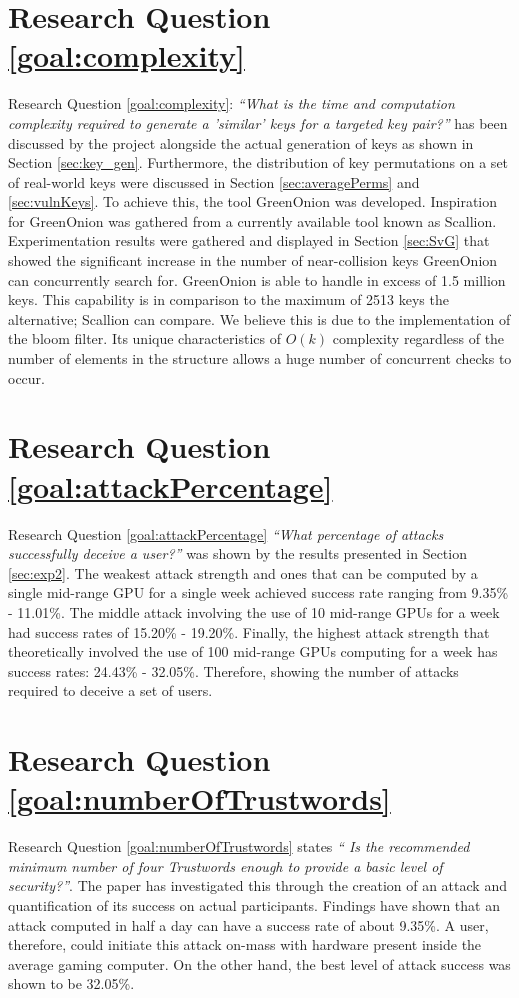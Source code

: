 \section{Research Question \ref{goal:complexity}}
Research Question \ref{goal:complexity}: \textit{``What is the time and computation complexity required to generate a ’similar’ keys for a targeted key pair?''} has been discussed by the project alongside the actual generation of keys as shown in Section \ref{sec:key_gen}. Furthermore, the distribution of key permutations on a set of real-world keys were discussed in Section \ref{sec:averagePerms} and \ref{sec:vulnKeys}. To achieve this, the tool GreenOnion was developed. Inspiration for GreenOnion was gathered from a currently available tool known as Scallion. Experimentation results were gathered and displayed in Section \ref{sec:SvG} that showed the significant increase in the number of near-collision keys GreenOnion can concurrently search for. GreenOnion is able to handle in excess of 1.5 million keys. This capability is in comparison to the maximum of 2513 keys the alternative; Scallion can compare. We believe this is due to the implementation of the bloom filter. Its unique characteristics of $O(k)$ complexity regardless of the number of elements in the structure allows a huge number of concurrent checks to occur. 

\section{Research Question \ref{goal:attackPercentage}}
Research Question \ref{goal:attackPercentage} \textit{``What percentage of attacks successfully deceive a user?''} was shown by the results presented in Section \ref{sec:exp2}. The weakest attack strength and ones that can be computed by a single mid-range GPU for a single week achieved success rate ranging from 9.35\% - 11.01\%. The middle attack involving the use of 10 mid-range GPUs for a week had success rates of 15.20\% - 19.20\%. Finally, the highest attack strength that theoretically involved the use of 100 mid-range GPUs computing for a week has success rates: 24.43\% - 32.05\%. Therefore, showing the number of attacks required to deceive a set of users.

\section{Research Question \ref{goal:numberOfTrustwords}}
Research Question \ref{goal:numberOfTrustwords} states \textit{`` Is the recommended minimum number of four Trustwords enough to provide a basic level of security?''}. The paper has investigated this through the creation of an attack and quantification of its success on actual participants. Findings have shown that an attack computed in half a day can have a success rate of about 9.35\%. A user, therefore, could initiate this attack on-mass with hardware present inside the average gaming computer. On the other hand, the best level of attack success was shown to be 32.05\%. 

